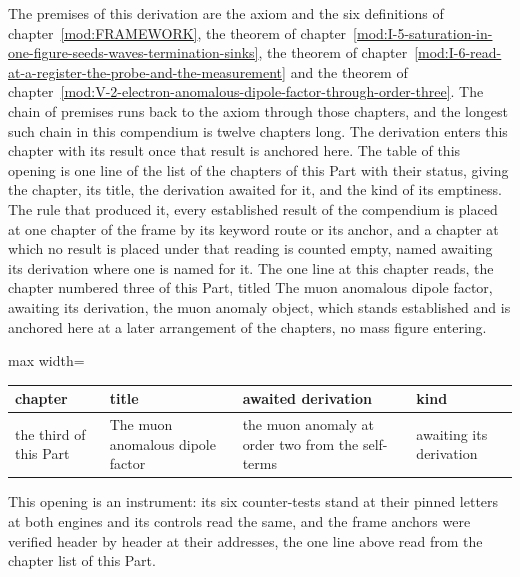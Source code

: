 \begin{chproof}[instrument]
The premises of this derivation are the axiom and the six definitions of chapter~\ref{mod:FRAMEWORK}, the theorem of chapter~\ref{mod:I-5-saturation-in-one-figure-seeds-waves-termination-sinks}, the theorem of chapter~\ref{mod:I-6-read-at-a-register-the-probe-and-the-measurement} and the theorem of chapter~\ref{mod:V-2-electron-anomalous-dipole-factor-through-order-three}. The chain of premises runs back to the axiom through those chapters, and the longest such chain in this compendium is twelve chapters long.
The derivation enters this chapter with its result once that result is anchored here.
The table of this opening is one line of the list of the chapters of this Part with their status, giving the chapter, its title, the derivation awaited for it, and the kind of its emptiness. The rule that produced it, every established result of the compendium is placed at one chapter of the frame by its keyword route or its anchor, and a chapter at which no result is placed under that reading is counted empty, named awaiting its derivation where one is named for it. The one line at this chapter reads, the chapter numbered three of this Part, titled The muon anomalous dipole factor, awaiting its derivation, the muon anomaly object, which stands established and is anchored here at a later arrangement of the chapters, no mass figure entering.
\begin{center}\begin{adjustbox}{max width=\linewidth}\begin{tabular}{llll}\hline chapter & title & awaited derivation & kind \\ \hline the third of this Part & The muon anomalous dipole factor & the muon anomaly at order two from the self-terms & awaiting its derivation \\ \hline \end{tabular}\end{adjustbox}\end{center}
This opening is an instrument: its six counter-tests stand at their pinned letters at both engines and its controls read the same, and the frame anchors were verified header by header at their addresses, the one line above read from the chapter list of this Part.
\end{chproof}

